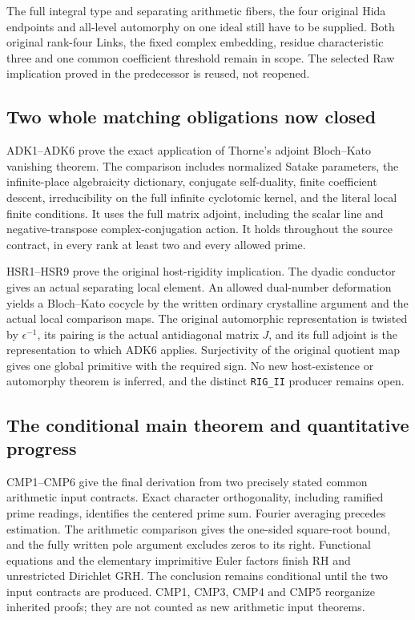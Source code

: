 The full integral type and separating arithmetic fibers,
the four original Hida endpoints and all-level automorphy on one ideal
still have to be supplied. Both original rank-four Links, the fixed
complex embedding, residue characteristic three and one common
coefficient threshold remain in scope. The selected Raw implication
proved in the predecessor is reused, not reopened.

\subsection{Two whole matching obligations now closed}

ADK1--ADK6 prove the exact application of Thorne's adjoint
Bloch--Kato vanishing theorem. The comparison includes normalized
Satake parameters, the infinite-place algebraicity dictionary,
conjugate self-duality, finite coefficient descent, irreducibility on
the full infinite cyclotomic kernel, and the literal local finite
conditions. It uses the full matrix adjoint, including the scalar line
and negative-transpose complex-conjugation action. It holds throughout
the source contract, in every rank at least two and every allowed prime.

HSR1--HSR9 prove the original host-rigidity implication. The dyadic
conductor gives an actual separating local element. An allowed
dual-number deformation yields a Bloch--Kato cocycle by the written
ordinary crystalline argument and the actual local comparison maps.
The original automorphic representation is twisted by
$\epsilon^{-1}$, its pairing is the actual antidiagonal matrix $J$,
and its full adjoint is the representation to which ADK6 applies.
Surjectivity of the original quotient map gives one global primitive
with the required sign. No new host-existence or automorphy theorem is
inferred, and the distinct \texttt{RIG\_\allowbreak II} producer remains open.

\subsection{The conditional main theorem and quantitative progress}

CMP1--CMP6 give the final derivation from two precisely stated common
arithmetic input contracts. Exact character orthogonality, including
ramified prime readings, identifies the centered prime sum. Fourier
averaging precedes estimation. The arithmetic comparison gives the
one-sided square-root bound, and the fully written pole argument
excludes zeros to its right. Functional equations and the elementary
imprimitive Euler factors finish RH and unrestricted Dirichlet GRH.
The conclusion remains conditional until the two input contracts are
produced. CMP1, CMP3, CMP4 and CMP5 reorganize inherited proofs; they
are not counted as new arithmetic input theorems.

